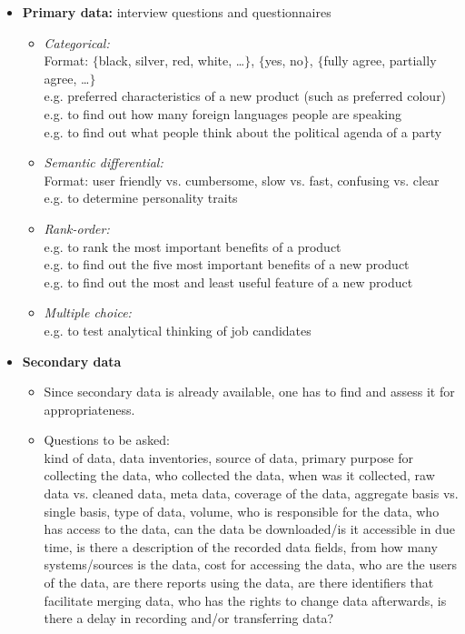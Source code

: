 \documentclass[a4paper, landscape, 6pt, fleqn]{scrartcl}
\renewcommand{\emph}[1]{\textbf{#1}}
\begin{document}
\begin{multicols*}{4}
\begin{itemize}
\item \emph{Primary data:} interview questions and questionnaires
\begin{itemize}
\item \textit{Categorical:} \\
Format: $\lbrace$black, silver, red, white, \ldots$\rbrace$, $\lbrace$yes, no$\rbrace$, $\lbrace$fully agree, partially agree, \ldots$\rbrace$ \\
e.g. preferred characteristics of a new product (such as preferred colour) \\
e.g. to find out how many foreign languages people are speaking \\
e.g. to find out what people think about the political agenda of a party
\item \textit{Semantic differential:} \\
Format: user friendly vs. cumbersome, slow vs. fast, confusing vs. clear \\
e.g. to determine personality traits
\item \textit{Rank-order:} \\
e.g. to rank the most important benefits of a product \\
e.g. to find out the five most important benefits of a new product \\
e.g. to find out the most and least useful feature of a new product
\item \textit{Multiple choice:} \\
e.g. to test analytical thinking of job candidates
\end{itemize}
\item \emph{Secondary data}
\begin{itemize}
\item Since secondary data is already available, one has to find and assess it for appropriateness.
\item Questions to be asked: \\
kind of data, data inventories, source of data, primary purpose for collecting the data, who collected the data, when was it collected, raw data vs. cleaned data, meta data, coverage of the data, aggregate basis vs. single basis, type of data, volume, who is responsible for the data, who has access to the data, can the data be downloaded/is it accessible in due time, is there a description of the recorded data fields, from how many systems/sources is the data, cost for accessing the data, who are the users of the data, are there reports using the data, are there identifiers that facilitate merging data, who has the rights to change data afterwards, is there a delay in recording and/or transferring data?
\end{itemize}
\end{itemize}


\end{multicols*}
\end{document}
